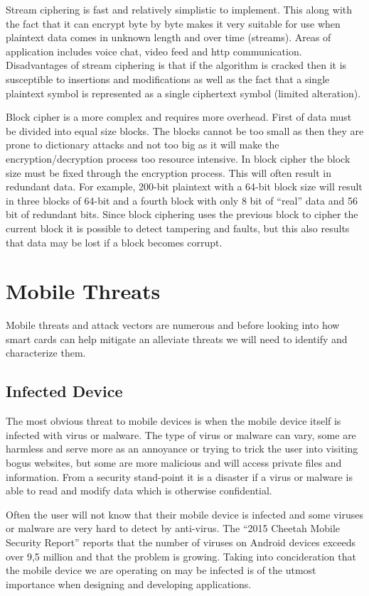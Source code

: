 Stream ciphering is fast and relatively simplistic to implement. This along with the fact that it can encrypt byte by byte makes it very suitable for use when plaintext data comes in  unknown length and over time (streams). Areas of application includes voice chat, video feed and http communication. Disadvantages of stream ciphering is that if the algorithm is cracked then it is susceptible to insertions and modifications as well as the fact that a single plaintext symbol is represented as a single ciphertext symbol (limited alteration).

Block cipher is a more complex and requires more overhead. First of data must be divided into equal size blocks. The blocks cannot be too small as then they are prone to dictionary attacks and not too big as it will make the encryption/decryption process too resource intensive. In block cipher the block size must be fixed through the encryption process. This will often result in redundant data. For example, 200-bit plaintext with a 64-bit block size will result in three blocks of 64-bit and a fourth block with only 8 bit of ``real'' data and 56 bit of redundant bits. Since block ciphering uses the previous block to cipher the current block it is possible to detect tampering and faults, but this also results that data may be lost if a block becomes corrupt.


\section{Mobile Threats}
Mobile threats and attack vectors are numerous and before looking into how smart cards can help mitigate an alleviate threats we will need to identify and characterize them.
\subsection{Infected Device}
The most obvious threat to mobile devices is when the mobile device itself is infected with virus or malware. The type of virus or malware can vary, some are harmless and serve more as an annoyance or trying to trick the user into visiting bogus websites, but some are more malicious and will access private files and information. From a security stand-point it is a disaster if a virus or malware is able to read and modify data which is otherwise confidential.

Often the user will not know that their mobile device is infected and some viruses or malware are very hard to detect by anti-virus. The ``2015 Cheetah Mobile Security Report'' \cite{cheetahSec} reports that the number of viruses on Android devices exceeds over 9,5 million and that the problem is growing. Taking into concideration that the mobile device we are operating on may be infected is of the utmost importance when designing and developing applications.


